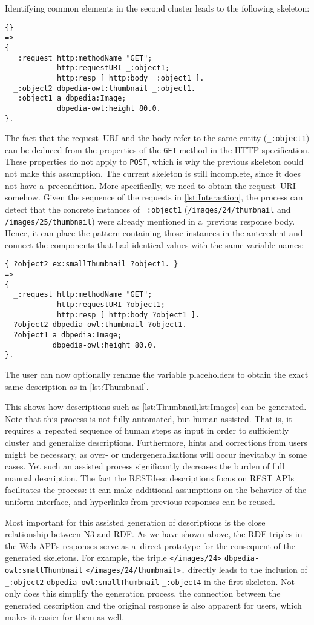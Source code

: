 Identifying common elements in the second cluster
leads to the following skeleton:
\begin{Verbatim}
{}
=>
{
  _:request http:methodName "GET";
            http:requestURI _:object1;
            http:resp [ http:body _:object1 ].
  _:object2 dbpedia-owl:thumbnail _:object1.
  _:object1 a dbpedia:Image;
            dbpedia-owl:height 80.0.
}.
\end{Verbatim}
The fact that the request~URI and the body refer to the same entity (\verb!_:object1!)
can be deduced from the properties of the \verb!GET! method in the HTTP specification.
These properties do not apply to \verb!POST!,
which is why the previous skeleton could not make this assumption.
The current skeleton is still incomplete, since it does not have a~precondition.
More specifically, we need to obtain the request~URI somehow.
Given the sequence of the requests in \cref{lst:Interaction},
the process can detect that the concrete instances of \verb!_:object1!
(\verb!/images/24/thumbnail! and \verb!/images/25/thumbnail!)
were already mentioned in a~previous response body.
Hence, it can place the pattern containing those instances in the antecedent
and connect the components that had identical values with the same variable names:
\begin{Verbatim}
{ ?object2 ex:smallThumbnail ?object1. }
=>
{
  _:request http:methodName "GET";
            http:requestURI ?object1;
            http:resp [ http:body ?object1 ].
  ?object2 dbpedia-owl:thumbnail ?object1.
  ?object1 a dbpedia:Image;
           dbpedia-owl:height 80.0.
}.
\end{Verbatim}
The user can now optionally rename the variable placeholders
to obtain the exact same description as in \cref{lst:Thumbnail}.

This shows how descriptions such as \cref{lst:Thumbnail,lst:Images}
can be generated.
Note that this process is not fully automated, but human-assisted.
That is, it requires a~repeated sequence of human steps as input
in order to sufficiently cluster and generalize descriptions.
Furthermore, hints and corrections from users might be necessary,
as over- or undergeneralizations will occur inevitably in some cases.
Yet such an assisted process significantly decreases the burden
of full manual description.
The fact the RESTdesc descriptions focus on REST APIs facilitates the process:
it can make additional assumptions on the behavior of the uniform interface,
and hyperlinks from previous responses can be reused.

Most important for this assisted generation of descriptions
is the close relationship between N3 and RDF.
As we have shown above, the RDF triples in the Web API's responses
serve as a~direct prototype for the consequent of the generated skeletons.
For example, the triple
\verb!</images/24>! \verb!dbpedia-owl:smallThumbnail! \verb!</images/24/thumbnail>.!
directly leads to the inclusion of
\verb!_:object2! \verb!dbpedia-owl:smallThumbnail! \verb!_:object4!
in the first skeleton.
Not only does this simplify the generation process,
the connection between the generated description
and the original response is also apparent for users,
which makes it easier for them as well.




